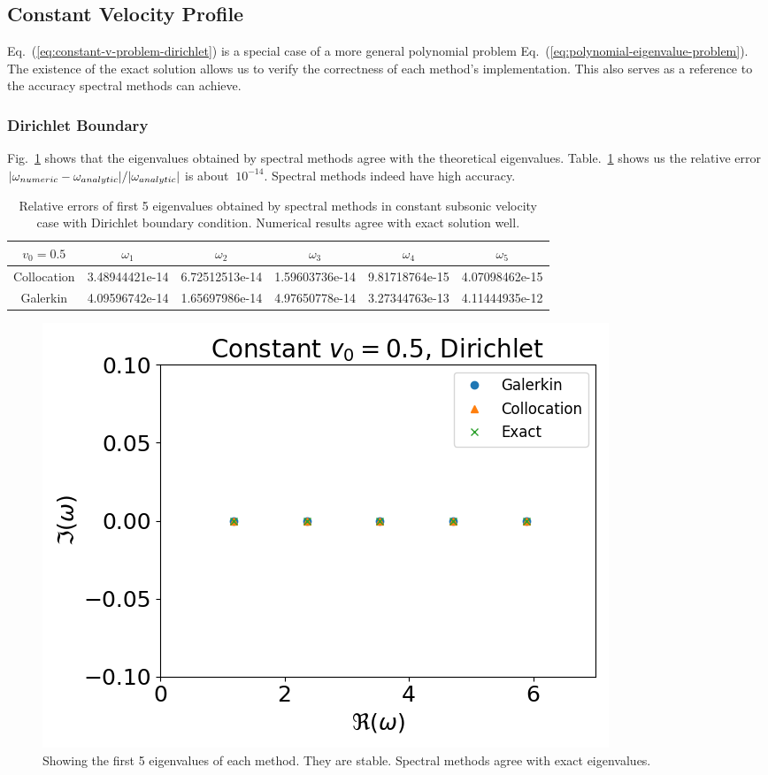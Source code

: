 \subsection{Constant Velocity Profile}
Eq.~(\ref{eq:constant-v-problem-dirichlet}) is a special case of a more general polynomial problem Eq.~(\ref{eq:polynomial-eigenvalue-problem}). The existence of the exact solution allows us to verify the correctness of each method's implementation. This also serves as a reference to the accuracy spectral methods can achieve.

\subsubsection*{Dirichlet Boundary}
Fig.~\ref{fig:constant-subsonic-dirichlet} shows that the eigenvalues obtained by spectral methods agree with the theoretical eigenvalues. Table.~\ref{table:eigenvalue-error-constant-subsonic-dirichlet} shows us the relative error $\abs{\omega_{numeric} - \omega_{analytic}}/\abs{\omega_{analytic}}$ is about $~10^{-14}$. Spectral methods indeed have high accuracy.

\begin{table} [H]
	\centering
	\caption{Relative errors of first 5 eigenvalues obtained by spectral methods in constant subsonic velocity case with Dirichlet boundary condition. Numerical results agree with exact solution well.}
	\begin{tabular}{|c|c|c|c|c|c|}
		\hline
		$v_0=0.5$   & $\omega_1$     & $\omega_2$     & $\omega_3$     & $\omega_4$     & $\omega_5$     \\
		\hline
		Collocation & 3.48944421e-14 & 6.72512513e-14 & 1.59603736e-14 & 9.81718764e-15 & 4.07098462e-15 \\
		\hline
		Galerkin    & 4.09596742e-14 & 1.65697986e-14 & 4.97650778e-14 & 3.27344763e-13 & 4.11444935e-12 \\
		\hline
	\end{tabular}
	\label{table:eigenvalue-error-constant-subsonic-dirichlet}
\end{table}

\begin{figure}[H]
	\centering
	\includegraphics[width=0.7\linewidth]{figures/constant-subsonic-dirichlet.png}
	\caption{Showing the first 5 eigenvalues of each method. They are stable. Spectral methods agree with exact eigenvalues.}
	\label{fig:constant-subsonic-dirichlet}
\end{figure}


